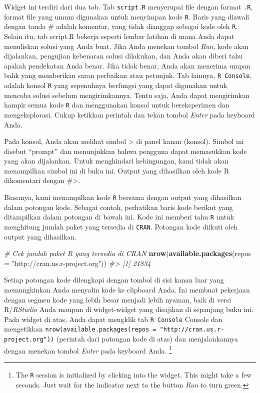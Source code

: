 \documentclass[
  oneside]{book}
\newenvironment{Shaded}{\begin{snugshade}}{\end{snugshade}}
\newcommand{\AttributeTok}[1]{\textcolor[rgb]{0.13,0.29,0.53}{#1}}
\newcommand{\CommentTok}[1]{\textcolor[rgb]{0.56,0.35,0.01}{\textit{#1}}}
\newcommand{\FunctionTok}[1]{\textcolor[rgb]{0.13,0.29,0.53}{\textbf{#1}}}
\newcommand{\NormalTok}[1]{#1}
\newcommand{\StringTok}[1]{\textcolor[rgb]{0.31,0.60,0.02}{#1}}
\begin{document}
Widget ini terdiri dari dua tab. Tab \texttt{script.R} menyerupai file dengan format \texttt{.R}, format file yang umum digunakan untuk menyimpan kode \texttt{R}. Baris yang diawali dengan tanda \# adalah komentar, yang tidak dianggap sebagai kode oleh \texttt{R}. Selain itu, tab script.R bekerja seperti lembar latihan di mana Anda dapat menuliskan solusi yang Anda buat. Jika Anda menekan tombol \emph{Run}, kode akan dijalankan, pengujian kebenaran solusi dilakukan, dan Anda akan diberi tahu apakah pendekatan Anda benar. Jika tidak benar, Anda akan menerima umpan balik yang memberikan saran perbaikan atau petunjuk. Tab lainnya, \texttt{R Console}, adalah konsol \texttt{R} yang sepenuhnya berfungsi yang dapat digunakan untuk mencoba solusi sebelum mengirimkannya. Tentu saja, Anda dapat mengirimkan hampir semua kode \texttt{R} dan menggunakan konsol untuk bereksperimen dan mengeksplorasi. Cukup ketikkan perintah dan tekan tombol \emph{Enter} pada keyboard Anda.

Pada konsol, Anda akan melihat simbol \textgreater{} di panel kanan (konsol). Simbol ini disebut ``prompt'' dan menunjukkan bahwa pengguna dapat memasukkan kode yang akan dijalankan. Untuk menghindari kebingungan, kami tidak akan menampilkan simbol ini di buku ini. Output yang dihasilkan oleh kode R dikomentari dengan \#\textgreater{}.

Biasanya, kami menampilkan kode \texttt{R} bersama dengan output yang dihasilkan dalam potongan kode. Sebagai contoh, perhatikan baris kode berikut yang ditampilkan dalam potongan di bawah ini. Kode ini memberi tahu \texttt{R} untuk menghitung jumlah paket yang tersedia di \texttt{CRAN}. Potongan kode diikuti oleh output yang dihasilkan.

\begin{Shaded}
\begin{Highlighting}[]
\CommentTok{\# Cek jumlah paket R yang tersedia di CRAN}
\FunctionTok{nrow}\NormalTok{(}\FunctionTok{available.packages}\NormalTok{(}\AttributeTok{repos =} \StringTok{"http://cran.us.r{-}project.org"}\NormalTok{))}
\CommentTok{\#\textgreater{} [1] 21834}
\end{Highlighting}
\end{Shaded}

Setiap potongan kode dilengkapi dengan tombol di sisi kanan luar yang memungkinkan Anda menyalin kode ke clipboard Anda. Ini membuat pekerjaan dengan segmen kode yang lebih besar menjadi lebih nyaman, baik di versi R/\emph{RStudio} Anda maupun di widget-widget yang disajikan di sepanjang buku ini. Pada widget di atas, Anda dapat mengklik tab \texttt{R Console} Console dan mengetikkan \texttt{nrow(available.packages(repos\ =\ "http://cran.us.r-project.org"))} (perintah dari potongan kode di atas) dan menjalankannya dengan menekan tombol \emph{Enter} pada keyboard Anda. \footnote{The \texttt{R} session is initialized by clicking into
  the widget. This might take a few seconds. Just wait for the
  indicator next to the button \emph{Run} to turn green.}
\end{document}
